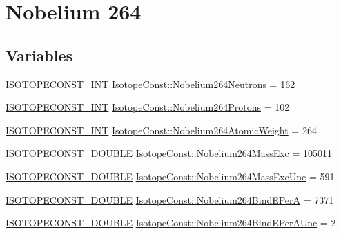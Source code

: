 \hypertarget{group___isotope_const-_nobelium-_no264}{}\section{Nobelium 264}
\label{group___isotope_const-_nobelium-_no264}
\subsection*{Variables}
\begin{DoxyCompactItemize}
\item 
\mbox{\hyperlink{group___isotope_const-_macros_ga5f18360b3e99483a35c32d789e62621c}{I\+S\+O\+T\+O\+P\+E\+C\+O\+N\+S\+T\+\_\+\+I\+NT}} \mbox{\hyperlink{group___isotope_const-_nobelium-_no264_ga11c3a1a8c12378c2d757b85809036a97}{Isotope\+Const\+::\+Nobelium264\+Neutrons}} = 162
\item 
\mbox{\hyperlink{group___isotope_const-_macros_ga5f18360b3e99483a35c32d789e62621c}{I\+S\+O\+T\+O\+P\+E\+C\+O\+N\+S\+T\+\_\+\+I\+NT}} \mbox{\hyperlink{group___isotope_const-_nobelium-_no264_gad1df31d779853e6d44f3ae8b3181e58a}{Isotope\+Const\+::\+Nobelium264\+Protons}} = 102
\item 
\mbox{\hyperlink{group___isotope_const-_macros_ga5f18360b3e99483a35c32d789e62621c}{I\+S\+O\+T\+O\+P\+E\+C\+O\+N\+S\+T\+\_\+\+I\+NT}} \mbox{\hyperlink{group___isotope_const-_nobelium-_no264_ga277a0c073b85ac4d92eba1f4d3c774bd}{Isotope\+Const\+::\+Nobelium264\+Atomic\+Weight}} = 264
\item 
\mbox{\hyperlink{group___isotope_const-_macros_ga8f45a7272ce02c0b4c65c44636ed719a}{I\+S\+O\+T\+O\+P\+E\+C\+O\+N\+S\+T\+\_\+\+D\+O\+U\+B\+LE}} \mbox{\hyperlink{group___isotope_const-_nobelium-_no264_ga0cd22ec4508ef627a46456725b302342}{Isotope\+Const\+::\+Nobelium264\+Mass\+Exc}} = 105011
\item 
\mbox{\hyperlink{group___isotope_const-_macros_ga8f45a7272ce02c0b4c65c44636ed719a}{I\+S\+O\+T\+O\+P\+E\+C\+O\+N\+S\+T\+\_\+\+D\+O\+U\+B\+LE}} \mbox{\hyperlink{group___isotope_const-_nobelium-_no264_ga18f96949c7cb14d86abf79b2e4c9671d}{Isotope\+Const\+::\+Nobelium264\+Mass\+Exc\+Unc}} = 591
\item 
\mbox{\hyperlink{group___isotope_const-_macros_ga8f45a7272ce02c0b4c65c44636ed719a}{I\+S\+O\+T\+O\+P\+E\+C\+O\+N\+S\+T\+\_\+\+D\+O\+U\+B\+LE}} \mbox{\hyperlink{group___isotope_const-_nobelium-_no264_ga585273cfed813ee6d6855989df8e2462}{Isotope\+Const\+::\+Nobelium264\+Bind\+E\+PerA}} = 7371
\item 
\mbox{\hyperlink{group___isotope_const-_macros_ga8f45a7272ce02c0b4c65c44636ed719a}{I\+S\+O\+T\+O\+P\+E\+C\+O\+N\+S\+T\+\_\+\+D\+O\+U\+B\+LE}} \mbox{\hyperlink{group___isotope_const-_nobelium-_no264_ga8d55a451b39e125fdcdfd54e80cb3236}{Isotope\+Const\+::\+Nobelium264\+Bind\+E\+Per\+A\+Unc}} = 2

\end{DoxyCompactItemize}
